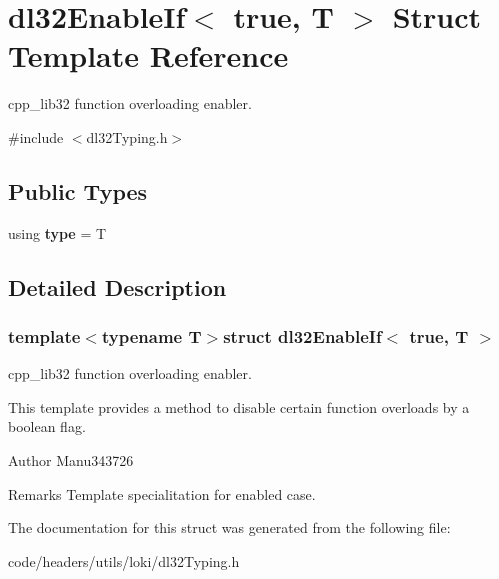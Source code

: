 \hypertarget{structdl32_enable_if_3_01true_00_01_t_01_4}{\section{dl32\-Enable\-If$<$ true, T $>$ Struct Template Reference}
\label{structdl32_enable_if_3_01true_00_01_t_01_4}
}


cpp\-\_\-lib32 function overloading enabler.  




{\ttfamily \#include $<$dl32\-Typing.\-h$>$}

\subsection*{Public Types}
\begin{DoxyCompactItemize}
\item 
\hypertarget{structdl32_enable_if_3_01true_00_01_t_01_4_a5625e397872155958e444baf4d1e476b}{using {\bfseries type} = T}\label{structdl32_enable_if_3_01true_00_01_t_01_4_a5625e397872155958e444baf4d1e476b}

\end{DoxyCompactItemize}


\subsection{Detailed Description}
\subsubsection*{template$<$typename T$>$struct dl32\-Enable\-If$<$ true, T $>$}

cpp\-\_\-lib32 function overloading enabler. 

This template provides a method to disable certain function overloads by a boolean flag.

\begin{DoxyAuthor}{Author}
Manu343726
\end{DoxyAuthor}
\begin{DoxyRemark}{Remarks}
Template specialitation for enabled case. 
\end{DoxyRemark}


The documentation for this struct was generated from the following file\-:\begin{DoxyCompactItemize}
\item 
code/headers/utils/loki/dl32\-Typing.\-h\end{DoxyCompactItemize}
